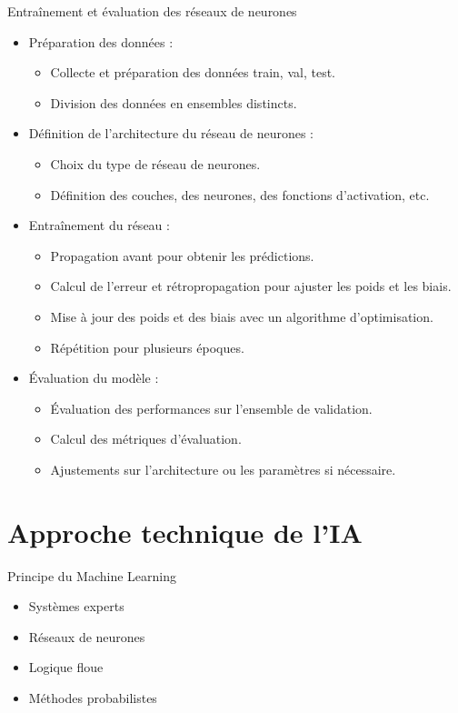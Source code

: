 \documentclass{beamer}
\begin{document}
\begin{frame}{Entraînement et évaluation des réseaux de neurones }
	\begin{itemize}
		\item Préparation des données :
		\begin{itemize}
			\item Collecte et préparation des données train, val, test.
			\item Division des données en ensembles distincts.
		\end{itemize}
		
		\item Définition de l'architecture du réseau de neurones :
		\begin{itemize}
			\item Choix du type de réseau de neurones.
			\item Définition des couches, des neurones, des fonctions d'activation, etc.
		\end{itemize}
		
		\item Entraînement du réseau :
		\begin{itemize}
			\item Propagation avant pour obtenir les prédictions.
			\item Calcul de l'erreur et rétropropagation pour ajuster les poids et les biais.
			\item Mise à jour des poids et des biais avec un algorithme d'optimisation.
			\item Répétition pour plusieurs époques.
		\end{itemize}
		
		\item Évaluation du modèle :
		\begin{itemize}
			\item Évaluation des performances sur l'ensemble de validation.
			\item Calcul des métriques d'évaluation.
			\item Ajustements sur l'architecture ou les paramètres si nécessaire.
		\end{itemize}
	\end{itemize}
\end{frame}




	\section{Approche technique de l'IA}
\begin{frame}{Principe du Machine Learning}
	\begin{itemize}
		\item Systèmes experts
		\item Réseaux de neurones
		\item Logique floue
		\item Méthodes probabilistes
	\end{itemize}
\end{frame}
\end{document}
